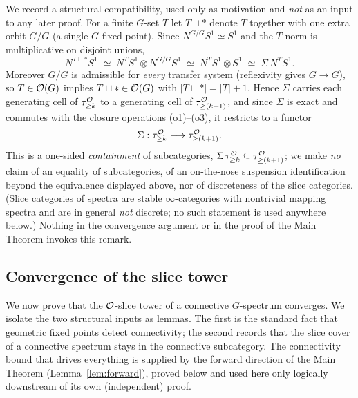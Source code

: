 \begin{qfiveremark}\label{rem:susp}
We record a structural compatibility, used only as motivation and \emph{not} as
an input to any later proof. For a finite $G$-set $T$ let $T\sqcup\ast$ denote
$T$ together with one extra orbit $G/G$ (a single $G$-fixed point). Since
$N^{G/G}S^1\simeq S^1$ and the $T$-norm is multiplicative on disjoint unions,
\[
N^{T\sqcup\ast}S^1\;\simeq\;N^{T}S^1\otimes N^{G/G}S^1\;\simeq\;N^{T}S^1\otimes S^1
\;\simeq\;\Sigma\, N^{T}S^1 .
\]
Moreover $G/G$ is admissible for \emph{every} transfer system (reflexivity gives
$G\to G$), so $T\in\mathcal{O}(G)$ implies $T\sqcup\ast\in\mathcal{O}(G)$ with
$|T\sqcup\ast|=|T|+1$. Hence $\Sigma$ carries each generating cell of
$\tau^{\mathcal{O}}_{\ge k}$ to a generating cell of $\tau^{\mathcal{O}}_{\ge(k+1)}$, and since
$\Sigma$ is exact and commutes with the closure operations (o1)--(o3), it
restricts to a functor
\[
\Sigma:\tau^{\mathcal{O}}_{\ge k}\longrightarrow\tau^{\mathcal{O}}_{\ge(k+1)} .
\]
This is a one-sided \emph{containment} of subcategories, $\Sigma\,\tau^{\mathcal{O}}_{\ge
k}\subseteq\tau^{\mathcal{O}}_{\ge(k+1)}$; we make \emph{no} claim of an equality of
subcategories, of an on-the-nose suspension identification beyond the
equivalence displayed above, nor of discreteness of the slice categories. (Slice
categories of spectra are stable $\infty$-categories with nontrivial mapping
spectra and are in general \emph{not} discrete; no such statement is used
anywhere below.) Nothing in the convergence argument or in the proof of the Main
Theorem invokes this remark.
\end{qfiveremark}

\subsection*{Convergence of the slice tower}

We now prove that the $\mathcal{O}$-slice tower of a connective $G$-spectrum
converges. We isolate the two structural inputs as lemmas. The first is the
standard fact that geometric fixed points detect connectivity; the second
records that the slice cover of a connective spectrum stays in the connective
subcategory. The connectivity bound that drives everything is supplied by the
forward direction of the Main Theorem (Lemma~\ref{lem:forward}), proved below
and used here only logically downstream of its own (independent) proof.

